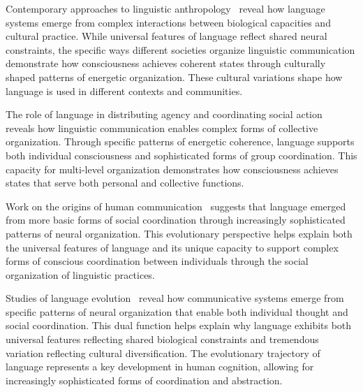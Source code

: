 Contemporary approaches to linguistic anthropology~\cite{Duranti2009, bosl2025dynamical, Silverstein1976} reveal how language systems emerge from complex interactions between biological capacities and cultural practice. While universal features of language reflect shared neural constraints, the specific ways different societies organize linguistic communication demonstrate how consciousness achieves coherent states through culturally shaped patterns of energetic organization. These cultural variations shape how language is used in different contexts and communities.


The role of language in distributing agency and coordinating social action~\cite{Arbib2012, butlin2023consciousnessartificialintelligenceinsights} reveals how linguistic communication enables complex forms of collective organization. Through specific patterns of energetic coherence, language supports both individual consciousness and sophisticated forms of group coordination. This capacity for multi-level organization demonstrates how consciousness achieves states that serve both personal and collective functions.

Work on the origins of human communication~\cite{Tomasello2008, butlin2023consciousnessartificialintelligenceinsights} suggests that language emerged from more basic forms of social coordination through increasingly sophisticated patterns of neural organization. This evolutionary perspective helps explain both the universal features of language and its unique capacity to support complex forms of conscious coordination between individuals through the social organization of linguistic practices.


Studies of language evolution~\cite{Hauser2002, Deacon1997, da2024mathematical, van2025processes} reveal how communicative systems emerge from specific patterns of neural organization that enable both individual thought and social coordination. This dual function helps explain why language exhibits both universal features reflecting shared biological constraints and tremendous variation reflecting cultural diversification. The evolutionary trajectory of language represents a key development in human cognition, allowing for increasingly sophisticated forms of coordination and abstraction.

